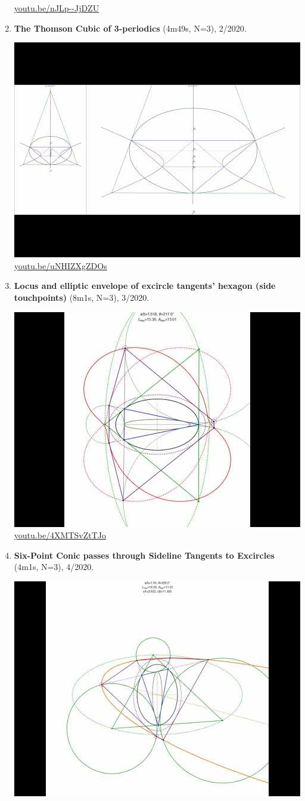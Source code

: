 \documentclass[12pt]{amsart}
\begin{document}
\begin{enumerate}[resume]
\begin{center}
\href{https://youtu.be/nJLp--JjDZU}{\url{youtu.be/nJLp--JjDZU}}\end{center}
% 
\item \textbf{The Thomson Cubic of 3-periodics} (4m49s, N=3), 2/2020. 
\begin{center}\includegraphics[width=.5\textwidth]{pics/uNHIZXgZDOs.jpg} \\ 
\href{https://youtu.be/uNHIZXgZDOs}{\url{youtu.be/uNHIZXgZDOs}}\end{center}
% 
\item \textbf{Locus and elliptic envelope of excircle tangents' hexagon (side touchpoints)} (8m1s, N=3), 3/2020. 
\begin{center}\includegraphics[width=.5\textwidth]{pics/4XMTSvZtTJo.jpg} \\ 
\href{https://youtu.be/4XMTSvZtTJo}{\url{youtu.be/4XMTSvZtTJo}}\end{center}
% 
\item \textbf{Six-Point Conic passes through Sideline Tangents to Excircles} (4m1s, N=3), 4/2020. 
\begin{center}\includegraphics[width=.5\textwidth]{pics/kVtTR-aINX4.jpg} \\ 

\end{center}
\end{enumerate}
\end{document}
